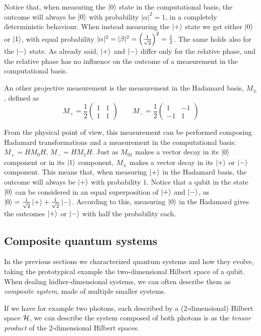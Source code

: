 Notice that, when measuring the $\ket{0}$ state in the computational basis, the outcome will always be $\ket{0}$ with probability $|\alpha|^2 = 1$, in a completely deterministic behaviour. 
When instead measuring the $\ket{+}$ state we get either $\ket{0}$ or $\ket{1}$, with equal probability $|\alpha|^2 = |\beta|^2 = \left(\frac{1}{\sqrt{2}}\right)^2 = \frac{1}{2}$. The same holds also for the $\ket{-}$ state. As already said, $\ket{+}$ and $\ket{-}$ differ only for the relative phase, and the relative phase has no influence on the outcome of a measurement in the computational basis.


An other projective measurement is the measurement in the Hadamard basis, $M_\pm$, defined as \[ M_+ = \frac{1}{2}\begin{pmatrix} 1 & 1 \\ 1 & 1\end{pmatrix} \qquad
M_- = \frac{1}{2}\begin{pmatrix}1 & -1 \\ -1 & 1\end{pmatrix} \]

From the physical point of view, this measurement can be performed composing Hadamard transformations and a measurement in the computational basis: $M_+ = HM_0H$, $M_- = H M_1 H$. Just as $M_{01}$ makes a vector decay in its $\ket{0}$ component or in its $\ket{1}$ component, $M_\pm$ makes a vector decay in its $\ket{+}$ or $\ket{-}$ component. This means that, when measuring $\ket{+}$ in the Hadamard basis, the outcome will always be $\ket{+}$ with probability $1$. Notice that a qubit in the state $\ket{0}$ can be considered in an equal superposition of $\ket{+}$ and $\ket{-}$, as $\ket{0} = \frac{1}{\sqrt{2}}\ket{+} + \frac{1}{\sqrt{2}}\ket{-}$. According to this, measuring $\ket{0}$ in the Hadamard gives the outcomes $\ket{+}$ or $\ket{-}$ with half the probability each.


\subsection{Composite quantum systems}
In the previous sections we characterized quantum systems and how they evolve, taking the prototypical example the two-dimensional Hilbert space of a qubit. When dealing hidher-dimensional systems, we can often describe them as \textit{composite system}, made of multiple smaller systems.

If we have for example two photons,  each described by a (2-dimensional) Hilbert space $\mathcal{H}$, we can describe the system composed of both photons is as the \textit{tensor product} of the 2-dimensional Hilbert spaces.	

